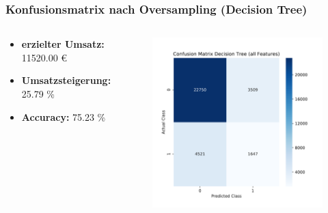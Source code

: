 \documentclass{beamer}
\begin{document}
\begin{frame}
\frametitle{Konfusionsmatrix nach Oversampling (Decision Tree)}
\begin{columns}[c] %

\begin{tiny}
\begin{itemize}
\item  \textbf{erzielter Umsatz:} 11520.00 \euro{}
\item \textbf{Umsatzsteigerung:}	25.79 \% 
\item \textbf{Accuracy:} 75.23 \%
\end{itemize}
\end{tiny}

\begin{figure}
\begin{center}
\includegraphics[width=.8\textwidth]{pdf/confusion2.pdf}
\end{center}
\end{figure}



\end{columns}
\end{frame}
\end{document}
